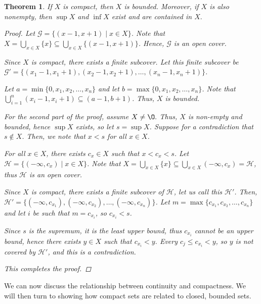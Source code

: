 \documentclass[11pt]{article}
\renewcommand{\emptyset}{\O}
\renewcommand{\_}[1]{\underline{ #1 }}
\newtheorem{theorem}{Theorem}[section]
\theoremstyle{definition}
\numberwithin{equation}{subsection}
\begin{document}
\begin{theorem}  \label{compactimpliesbounded} If $X$ is compact, then $X$ is bounded. Moreover, if $X$ is also nonempty, then
 $\sup X$ and $\inf X$ exist and are contained in $X.$
 
\begin{proof}
Let $\mathcal{G} = \{(x-1,x+1) \mid x \in X\}$. Note that $X = \bigcup_{x\in X}\{x\} \subseteq \bigcup_{x\in X} \{(x-1,x+1)\}$. Hence, $\mathcal{G}$ is an open cover.

Since $X$ is compact, there exists a finite subcover. Let this finite subcover be $\mathcal{G'} = \{(x_1-1,x_1+1), (x_2-1,x_2+1), \dots, (x_n-1,x_n+1)\}$.

Let $a = \min \{0, x_1, x_2, \dots, x_n\}$ and let $b = \max \{0, x_1, x_2, \dots, x_n\}$. Note that $\bigcup_{i=1}^n (x_i-1,x_i+1) \subseteq (a-1,b+1)$. Thus, $X$ is bounded.

For the second part of the proof, assume $X \neq \emptyset.$ Thus, $X$ is non-empty and bounded, hence $\sup X$ exists, so let $s = \sup X$. Suppose for a contradiction that $s \notin X$. Then, we note that $x<s$ for all $x \in X$.

For all $x \in X$, there exists $c_x \in X$ such that $x<c_x<s$. Let $\mathcal{H} = \{(-\infty, c_x) \mid x \in X\}$. Note that $X = \bigcup_{x\in X} \{x\} \subseteq \bigcup_{x\in X} (-\infty, c_x)=\mathcal{H}$, thus $\mathcal{H}$ is an open cover.

Since $X$ is compact, there exists a finite subcover of $\mathcal{H}$, let us call this $\mathcal{H'}$. Then, $\mathcal{H'} = \{(-\infty, c_{x_1}), (-\infty, c_{x_2}), \dots, (-\infty, c_{x_n})\}$. Let $m = \max \{c_{x_1}, c_{x_2}, \dots, c_{x_n}\}$ and let $i$ be such that $m = c_{x_i}$, so $c_{x_i}<s$. 

Since $s$ is the supremum, it is the least upper bound, thus $c_{x_i}$ cannot be an upper bound, hence there exists $y\in X$ such that $c_{x_i}<y$. Every $c_j\leq c_{x_i}<y$, so $y$ is not covered by $\mathcal{H'}$, and this is a contradiction.

This completes the proof.


\renewcommand\qedsymbol{QED}
\end{proof}


\end{theorem} 

We can now discuss the relationship between continuity and compactness. We will then turn to showing how compact sets are related to closed, bounded sets.
\end{document}
